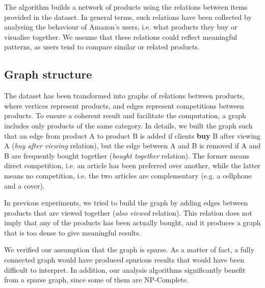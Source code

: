 \documentclass[11pt]{article}
\begin{document}
The algorithm builds a network of products using the relations between items provided in the dataset. In general terms, such relations have been collected by analysing the behaviour of Amazon's users, i.e. what products they buy or visualise together. We assume that these relations could reflect meaningful patterns, as users tend to compare similar or related products.

\subsection{Graph structure}
The dataset has been transformed into graphs of relations between products, where vertices represent products, and edges represent competitions between products. To ensure a coherent result and facilitate the computation, a graph includes only products of the same category. In details, we built the graph such that an edge from product A to product B is added if clients \textbf{buy} B after viewing A (\textit{buy after viewing} relation), but the edge between A and B is removed if A and B are frequently bought together (\textit{bought together} relation). The former means direct competition, i.e. an article has been preferred over another, while the latter means no competition, i.e. the two articles are complementary (e.g. a cellphone and a cover).

In previous experiments, we tried to build the graph by adding edges between products that are viewed together (\textit{also viewed} relation). This relation does not imply that any of the products has been actually bought, and it produces a graph that is too dense to give meaningful results. %

We verified our assumption that the graph is sparse. As a matter of fact, a fully connected graph would have produced spurious results that would have been difficult to interpret. In addition, our analysis algorithms significantly benefit from a sparse graph, since some of them are NP-Complete.

\end{document}
